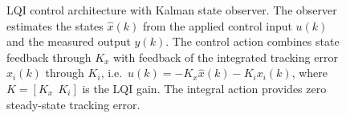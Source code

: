 \documentclass[12pt,a4paper]{article}
\begin{document}
\begin{figure}[ht]
    \caption{LQI control architecture with Kalman state observer. The observer
    estimates the states $\hat{x}(k)$ from the applied control input $u(k)$ and
    the measured output $y(k)$. The control action combines state feedback
    through $K_x$ with feedback of the integrated tracking error $x_i(k)$
    through $K_i$, i.e.\ $u(k) = -K_x\hat{x}(k) - K_i x_i(k)$, where
    $K = [K_x \;\, K_i]$ is the LQI gain. The integral action provides zero
    steady-state tracking error.}
    \label{fig:control_architecture}
\end{figure}

\newpage
\end{document}

